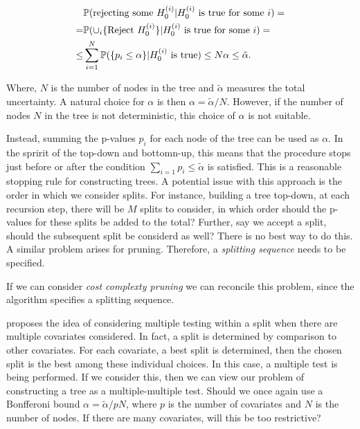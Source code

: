 \documentclass{article}
\theoremstyle{definition} \newtheorem{definition}[theorem]{Definition}
\theoremstyle{remark} \newtheorem{remark}[theorem]{Remark}
\begin{document}
\begin{align*}
  &\mathbb{P}(\textrm{rejecting some } H_0^{(i)} | H_0^{(i)} \textrm{ is true for
  some }i) = \\
  = &\mathbb{P}(\cup_i \{  \textrm{Reject } H_0^{(i)} \} | H_0^{(i)} \textrm{ is
  true for some $ i $}) = \\ 
  \leq  & \sum_{i=1}^{N}\mathbb {P}(\{ p_i \leq \alpha \} | H_0^{(i)} 
  \textrm{ is true} ) \leq N\alpha \leq \tilde{\alpha}.
\end{align*}

Where, $ N $ is the number of nodes in the tree and $ \tilde{\alpha} $ measures
the total uncertainty. A natural choice for $ \alpha $  is then $ \alpha =
\tilde{\alpha}/N $. However, if the number of nodes $ N $ in the tree is not
deterministic, this choice of $ \alpha $ is not suitable. 

Instead, summing the p-values $ p_i $ for each node of the tree can be used as $
\alpha $. In the spririt of the top-down and bottomn-up, this means that the
procedure stops just before or after the condition $ \sum_{i=1}^{} p_i \leq
\tilde{\alpha } $ is satisfied. This is a reasonable stopping rule for
constructing trees. A potential issue with this approach is the order in which
we consider splits. For instance, building a tree top-down, at each recursion
step, there will be $ M $ splits to consider, in which order should the p-values
for these splits be added to the total? Further, say we accept a split, should
the subsequent split be considerd as well? There is no best way to do this. A
similar problem arises for pruning. Therefore, a \textit{splitting sequence}
needs to be specified. 

If we can consider \textit{cost complexty pruning} we can reconcile this
problem, since the algorithm specifies a splitting sequence. 

\cite{jensen1997adjusting} proposes the idea of considering multiple testing
within a split when there are multiple covariates considered. In fact, a split
is determined by comparison to other covariates. For each covariate, a best
split is determined, then the chosen split is the best among these individual
choices. In this case, a multiple test is being performed. If we consider this,
then we can view our problem of constructing a tree as a multiple-multiple test.
Should we once again use a Bonfferoni bound $ \alpha = \tilde{\alpha}/pN $,
where $ p $ is the number of covariates and $ N $ is the number of nodes. If
there are many covariates, will this be too restrictive?
\end{document}
